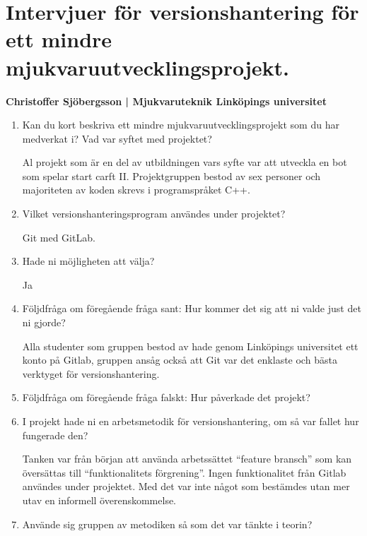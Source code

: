 \chapter{Intervjuer för versionshantering för ett mindre mjukvaruutvecklingsprojekt.}\label{appendix:bjorn}

\vspace{3em}
\begin{center}
    \textbf{Christoffer Sjöbergsson | Mjukvaruteknik Linköpings universitet}
\end{center}

\begin{enumerate}
    \item Kan du kort beskriva ett mindre mjukvaruutvecklingsprojekt som du har medverkat i? Vad var syftet med projektet?


    Al projekt som är en del av utbildningen vars syfte var att utveckla en bot som spelar start carft II. Projektgruppen bestod av sex personer och majoriteten av koden skrevs i programspråket C++.


    \item Vilket versionshanteringsprogram användes under projektet?

    Git med GitLab.

    \item Hade ni möjligheten att välja?

    Ja

    \item Följdfråga om föregående fråga sant: Hur kommer det sig att ni valde just det ni gjorde?

    Alla studenter som gruppen bestod av hade genom Linköpings universitet ett konto på Gitlab, gruppen ansåg också att Git var det enklaste och bästa verktyget för versionshantering.

    \item Följdfråga om föregående fråga falskt: Hur påverkade det projekt?

    \item I projekt hade ni en arbetsmetodik för versionshantering, om så var fallet hur fungerade den?

    Tanken var från början att använda arbetssättet ``feature bransch'' som kan översättas till ``funktionalitets förgrening''. Ingen funktionalitet från Gitlab användes under projektet. Med det var inte något som bestämdes utan mer utav en informell överenskommelse.

    \item Använde sig gruppen av metodiken så som det var tänkte i teorin?


\end{enumerate}
